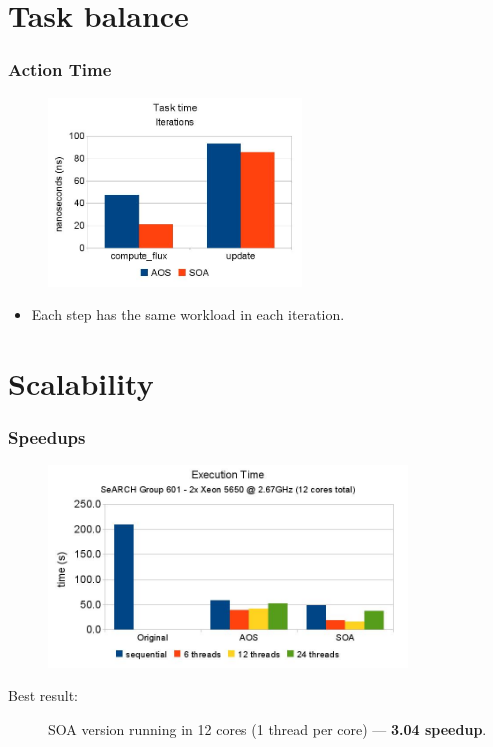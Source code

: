 \documentclass{beamer}
\begin{document}
\section{Task balance}
\begin{frame}
	\frametitle{Action Time}
	\begin{figure}
		\begin{center}
			\includegraphics[width=0.6\textwidth]{images/slides.april/iterations.jpg}
		\end{center}
	\end{figure}
	\begin{itemize}
		\item{Each step has the same workload in each iteration.}
	\end{itemize}
\end{frame}


\section{Scalability}
\begin{frame}
	\frametitle{Speedups}
	\begin{figure}
		\begin{center}
			\includegraphics[width=0.85\textwidth]{images/slides.april/exectime.jpg}
		\end{center}
	\end{figure}
	\begin{description}
		\item[Best result:]{SOA version running in 12 cores (1 thread per core) --- \textbf{3.04 speedup}.}
	\end{description}
\end{frame}
\end{document}

